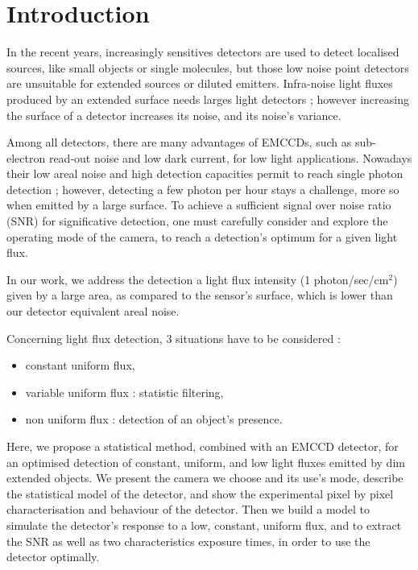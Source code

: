 
\section{Introduction}

In the recent years, increasingly sensitives detectors are used to detect localised sources, like small objects or single molecules, but those low noise point detectors are unsuitable for extended sources or diluted emitters. 
Infra-noise light fluxes produced by an extended surface needs larges light detectors ; however increasing the surface of a detector increases its noise, and its noise's variance.

Among all detectors, there are many advantages of EMCCDs, such as sub-electron read-out noise and low dark current, for low light applications. Nowadays their low areal noise and high detection capacities permit to reach single photon detection ; however, detecting a few photon per hour stays a challenge, more so when emitted by a large surface. To achieve a sufficient signal over noise ratio (SNR) for significative detection, one must carefully consider and explore the operating mode of the camera, to reach a detection's optimum for a given light flux.

In our work, we address the detection a light flux intensity (1 photon/sec/cm$^2$) given by a large area, as compared to the sensor's surface, which is lower than our detector equivalent areal noise. %

Concerning light flux detection, 3 situations have to be considered :
\begin{itemize}
\item constant uniform flux,
\item variable uniform flux :  statistic filtering,
\item non uniform flux : detection of an object's presence.
\end{itemize}

Here, we propose a statistical method, combined with an EMCCD detector, for an optimised detection of constant, uniform, and low light fluxes emitted by dim extended objects.
We present the camera we choose and its use's mode,  describe the statistical model of the detector, and show the experimental pixel by pixel characterisation and behaviour of the detector. 
Then we build a model to simulate the detector's response to a low, constant, uniform flux, and to extract the SNR as well as two characteristics exposure times, in order to use the detector optimally.






